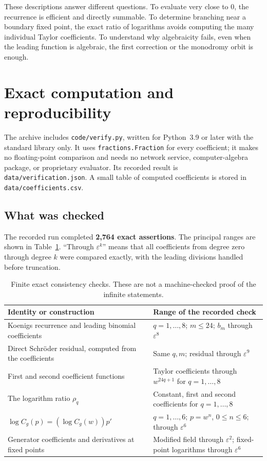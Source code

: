 \documentclass[11pt,a4paper]{article}
\numberwithin{equation}{section}
\theoremstyle{definition}
\theoremstyle{remark}
\newcommand{\eps}{\varepsilon}
\begin{document}
These descriptions answer different questions.  To evaluate very close to
$0$, the recurrence is efficient and directly summable.  To determine
branching near a boundary fixed point, the exact ratio of logarithms avoids
computing the many individual Taylor coefficients.  To understand why
algebraicity fails, even when the leading function is algebraic, the first
correction or the monodromy orbit is enough.

\section{Exact computation and reproducibility}
\label{sec:computation}

The archive includes \texttt{code/verify.py}, written for Python~3.9 or
later with the standard library only.  It uses \texttt{fractions.Fraction}
for every coefficient; it makes no floating-point comparison and needs no
network service, computer-algebra package, or proprietary evaluator.
Its recorded result is \texttt{data/verification.json}.  A small table of
computed coefficients is stored in \texttt{data/coefficients.csv}.

\subsection{What was checked}

The recorded run completed \textbf{2,764 exact assertions}.  The principal
ranges are shown in Table~\ref{tab:checks}.  ``Through $\eps^k$'' means that
all coefficients from degree zero through degree $k$ were compared exactly,
with the leading divisions handled before truncation.

\begin{table}[htbp]
\centering
\small
\begin{tabular}{@{}p{}p{}@{}}
\toprule
Identity or construction & Range of the recorded check\\
\midrule
Koenigs recurrence and leading binomial coefficients
 & $q=1,\ldots,8$; $m\le24$; $b_m$ through $\eps^8$\\[4pt]
Direct Schr\"oder residual, computed from the coefficients
 & Same $q,m$; residual through $\eps^9$\\[4pt]
First and second coefficient functions
 & Taylor coefficients through $w^{24q+1}$ for $q=1,\ldots,8$\\[4pt]
The logarithm ratio $\rho_q$
 & Constant, first and second coefficients for $q=1,\ldots,8$\\[4pt]
$\log C_g(p)=(\log C_g(w))p'$
 & $q=1,\ldots,6$; $p=w^n$, $0\le n\le6$; through $\eps^6$\\[4pt]
Generator coefficients and derivatives at fixed points
 & Modified field through $\eps^2$; fixed-point logarithms through $\eps^6$\\
\bottomrule
\end{tabular}
\caption{Finite exact consistency checks.  These are not a machine-checked
proof of the infinite statements.}
\label{tab:checks}
\end{table}
\end{document}
